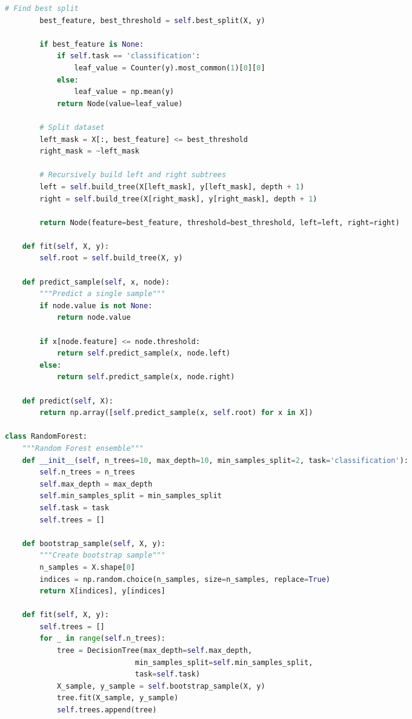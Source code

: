 \documentclass[8pt,landscape]{article}
\begin{document}
\begin{multicols}{3}
\begin{lstlisting}[language=Python]
        # Find best split
        best_feature, best_threshold = self.best_split(X, y)

        if best_feature is None:
            if self.task == 'classification':
                leaf_value = Counter(y).most_common(1)[0][0]
            else:
                leaf_value = np.mean(y)
            return Node(value=leaf_value)

        # Split dataset
        left_mask = X[:, best_feature] <= best_threshold
        right_mask = ~left_mask

        # Recursively build left and right subtrees
        left = self.build_tree(X[left_mask], y[left_mask], depth + 1)
        right = self.build_tree(X[right_mask], y[right_mask], depth + 1)

        return Node(feature=best_feature, threshold=best_threshold, left=left, right=right)

    def fit(self, X, y):
        self.root = self.build_tree(X, y)

    def predict_sample(self, x, node):
        """Predict a single sample"""
        if node.value is not None:
            return node.value

        if x[node.feature] <= node.threshold:
            return self.predict_sample(x, node.left)
        else:
            return self.predict_sample(x, node.right)

    def predict(self, X):
        return np.array([self.predict_sample(x, self.root) for x in X])

class RandomForest:
    """Random Forest ensemble"""
    def __init__(self, n_trees=10, max_depth=10, min_samples_split=2, task='classification'):
        self.n_trees = n_trees
        self.max_depth = max_depth
        self.min_samples_split = min_samples_split
        self.task = task
        self.trees = []

    def bootstrap_sample(self, X, y):
        """Create bootstrap sample"""
        n_samples = X.shape[0]
        indices = np.random.choice(n_samples, size=n_samples, replace=True)
        return X[indices], y[indices]

    def fit(self, X, y):
        self.trees = []
        for _ in range(self.n_trees):
            tree = DecisionTree(max_depth=self.max_depth,
                              min_samples_split=self.min_samples_split,
                              task=self.task)
            X_sample, y_sample = self.bootstrap_sample(X, y)
            tree.fit(X_sample, y_sample)
            self.trees.append(tree)


\end{lstlisting}
\end{multicols}
\end{document}
